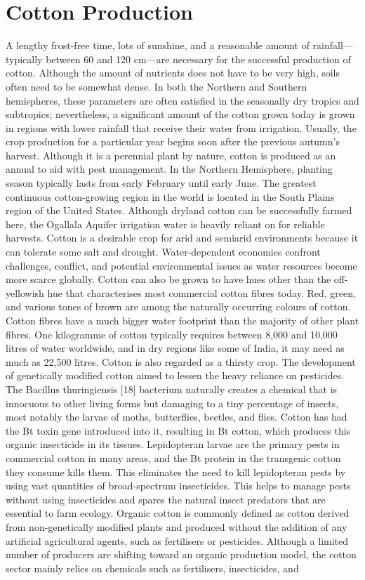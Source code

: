\documentclass[conference]{IEEEtran}
\begin{document}
\section{Cotton Production}
A lengthy frost-free time, lots of sunshine, and a reasonable amount of rainfall—typically between 60 and 120 cm—are necessary for the successful production of cotton. Although the amount of nutrients does not have to be very high, soils often need to be somewhat dense. In both the Northern and Southern hemispheres, these parameters are often satisfied in the seasonally dry tropics and subtropics; nevertheless, a significant amount of the cotton grown today is grown in regions with lower rainfall that receive their water from irrigation. Usually, the crop production for a particular year begins soon after the previous autumn's harvest. Although it is a perennial plant by nature, cotton is produced as an annual to aid with pest management. In the Northern Hemisphere, planting season typically lasts from early February until early June. The greatest continuous cotton-growing region in the world is located in the South Plains region of the United States. Although dryland cotton can be successfully farmed here, the Ogallala Aquifer irrigation water is heavily reliant on for reliable harvests. Cotton is a desirable crop for arid and semiarid environments because it can tolerate some salt and drought. Water-dependent economies confront challenges, conflict, and potential environmental issues as water resources become more scarce globally. Cotton can also be grown to have hues other than the off-yellowish hue that characterises most commercial cotton fibres today. Red, green, and various tones of brown are among the naturally occurring colours of cotton. Cotton fibres have a much bigger water footprint than the majority of other plant fibres. One kilogramme of cotton typically requires between 8,000 and 10,000 litres of water worldwide, and in dry regions like some of India, it may need as much as 22,500 litres. Cotton is also regarded as a thirsty crop. The development of genetically modified cotton aimed to lessen the heavy reliance on pesticides. The Bacillus thuringiensis [18] bacterium naturally creates a chemical that is innocuous to other living forms but damaging to a tiny percentage of insects, most notably the larvae of moths, butterflies, beetles, and flies. Cotton has had the Bt toxin gene introduced into it, resulting in Bt cotton, which produces this organic insecticide in its tissues. Lepidopteran larvae are the primary pests in commercial cotton in many areas, and the Bt protein in the transgenic cotton they consume kills them. This eliminates the need to kill lepidopteran pests by using vast quantities of broad-spectrum insecticides. This helps to manage pests without using insecticides and spares the natural insect predators that are essential to farm ecology. Organic cotton is commonly defined as cotton derived from non-genetically modified plants and produced without the addition of any artificial agricultural agents, such as fertilisers or pesticides. Although a limited number of producers are shifting toward an organic production model, the cotton sector mainly relies on chemicals such as fertilisers, insecticides, and 
\end{document}
